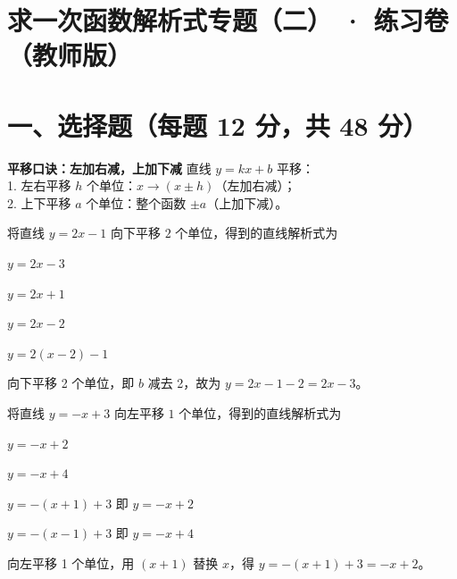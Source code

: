 \documentclass{exam-zh}
\begin{document}
\section*{求一次函数解析式专题（二） · 练习卷（教师版）}

\section*{一、选择题（每题 12 分，共 48 分）}


\begin{keyideabox}
  \textbf{平移口诀：左加右减，上加下减}
  直线 $y=kx+b$ 平移：\\ 1. 左右平移 $h$ 个单位：$x \to (x \pm h)$（左加右减）；\\ 2. 上下平移 $a$ 个单位：整个函数 $\pm a$（上加下减）。
\end{keyideabox}



\begin{question}[points=12]
  将直线 $y = 2x - 1$ 向下平移 $2$ 个单位，得到的直线解析式为
  \begin{choices}
    \item $y = 2x - 3$
    \item $y = 2x + 1$
    \item $y = 2x - 2$
    \item $y = 2(x - 2) - 1$
  \end{choices}
  \paren[A]
  \begin{solutionblock}
    向下平移 2 个单位，即 $b$ 减去 2，故为 $y = 2x - 1 - 2 = 2x - 3$。
  \end{solutionblock}
\end{question}



\begin{question}[points=12]
  将直线 $y = -x + 3$ 向左平移 $1$ 个单位，得到的直线解析式为
  \begin{choices}
    \item $y = -x + 2$
    \item $y = -x + 4$
    \item $y = -(x + 1) + 3$ 即 $y = -x + 2$
    \item $y = -(x - 1) + 3$ 即 $y = -x + 4$
  \end{choices}
  \paren[C]
  \begin{solutionblock}
    向左平移 1 个单位，用 $(x+1)$ 替换 $x$，得 $y = -(x+1) + 3 = -x + 2$。
  \end{solutionblock}
\end{question}
\end{document}
